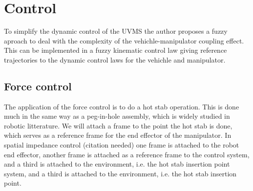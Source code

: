 \section{Control}

To simplify the dynamic control of the UVMS the author proposes a fuzzy aproach to deal with the complexity of the vehichle-manipulator coupling effect. This can be implemented in a fuzzy kinematic control law giving reference trajectories to the dynamic control laws for the vehichle and manipulator.

\subsection{Force control}

The application of the force control is to do a hot stab operation. This is done much in the same way as a peg-in-hole assembly, which is widely studied in robotic litterature. We will attach a frame to the point the hot stab is done, which serves as a reference frame for the end effector of the manipulator. In spatial impedance control (citation needed) one frame is attached to the robot end effector, another frame is attached as a reference frame to the control system, and a third is attached to the environment, i.e. the hot stab insertion point system, and a third is attached to the environment, i.e. the hot stab insertion point.   


